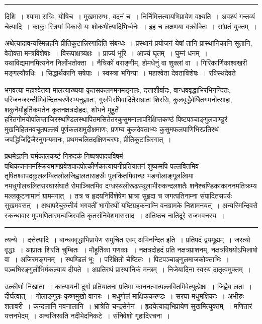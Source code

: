 \documentclass[11pt, openany]{book}
\begin{document}
\vspace{2mm}
\hrule

\noindent
{\s दिशि~। श्यामा रात्रिः, योषिच~। मुखमारम्भः, वदनं च~। निर्निमित्तत्यायभिप्रायेण वक्ष्यति~। अवश्यं गन्तव्यं चेत्यादि~। {\qt काकुः स्त्रियां विकारो यः शोकभीत्यादिभिर्ध्वनेः}~। इह च लक्षणया वक्रोक्तिः~। सांप्रतं युक्तम्~।

अथेत्यादावन्यस्मिन्नहनि प्रीतिकूटान्निरगादिति संबन्धः~। प्रस्थानं प्रयोजनं येषां तानि प्रास्थानिकानि सूतानि, वेदोक्ता मन्त्रविशेषाः~। विरूपाक्षत्र्यक्षः~। प्राज्यं भूरि~। आज्यं घृतम्~। घुम्नं धनम्~। यथाविद्यमानमित्यनेन निर्लोभतोक्ता~। नैचिकों वराङ्गीम्, होमधेनुं वा शुक्लां वा~। गिरिकार्णिकाश्वखरी मङ्गल्यौषधिः~। सिद्धार्थकानि सषेपाः~। स्वस्त्रा भगिन्या~। महाश्वेता देवताविशेषः~। रविस्थदेवते}

\newpage

\noindent
भगवत्या महाश्वेतया मालत्याख्यया कृतसकलगमनमङ्गलः, दत्ताशीर्वादः, वान्धववृद्धाभिरभिनन्दितः, परिजनजरन्तीभिर्वन्दितचरणैरभ्यनुज्ञातः, गुरुभिरभिवादितैराघ्रातः शिरसि, कुलवृद्धैर्वर्धितगमनोत्साहः, शकुनैमौहूर्तिकमतेन कृतनक्षत्रदोहदः, शोभने मुहूर्ते हरितगोमयोपलिप्ताजिरस्थण्डिलस्थापितमसितेतरकुसुममालापरिक्षिप्तकण्ठं पिष्टपञ्चाङ्गुलपाण्डुरं मुखनिहितनवचूतपल्लवं पूर्णकलशमुदीक्षमाणः, प्रणम्य कुलदेवताभ्यः कुसुमफलपाणिभिरप्रतिरथं जपद्धिजिद्विजैरनुगम्यमानः, प्रथमचलितदक्षिणचरणः, प्रीतिकूटान्निरगात्~।

प्रथमेऽहनि घर्मकालकष्टं निरुदकं निष्पत्रपादपविषमं पथिकजननमस्क्रियमाणप्रवेशपादपोत्कीर्णकात्यायनीप्रतियातनं शुष्कमपि पल्लवितमिव तृषितश्वापदकुललम्बितलोलजिह्वालतासहस्रैः पुलकितमिवाच्छ भङगोलाङ्गूललिामा नमधुगोलचलितसरघासंघातै रोमाञ्चितमिव दग्धस्थलीरूढस्थूलाभीरुकन्दलशतैः शनैश्चण्डिकाकाननमतिक्रम्य मल्लकूटनामानं ग्राममगात्~। तत्र च हृदयनिर्विशेषेण भ्रात्रा सुहृदा च जगत्पतिनाम्ना संपादितसपर्यः सुखमवसत्~। अथापरेचुरुत्तीर्य भगवतीं भागीरथीं यष्टिग्रहकनाम्नि वनग्रामके निशामनयत्~। अन्यस्मिन्दिवसे स्कन्धावार मुपमणितारमन्वजिरवति कृतसंनिवेशमाससाद~। अतिष्ठच नातिदूरे राजभवनस्य~।

\vspace{2mm}
\hrule

\noindent
{\s त्यन्ये~। {\qtt दत्तेत्यादि}~। बान्धववृद्धाभिप्रायेण समुचित एवम् {\qtt अभिनन्दित इति}~। प्रतिपदं द्वयमूह्यम्~। जरत्यो वृद्धाः~। आप्रातः शिरति चुम्बितः~। मौहूर्तिका गणकाः~। नक्षत्रदोहदं प्रति नक्षत्रप्राशनम्, नक्षत्रविषयोऽभिलाषो वा~। अजिरमङ्गनम्~। स्थण्डिलं भूः~। परिक्षितो चेष्टितः~। पिटपञ्चाङ्गुलमाजकोक्ताभिः~। पञ्चभिरङ्गुलीभिर्मकल्याय दीयते~। अप्रतिरथं प्रास्थानिकं मन्त्रम्~। निजेयादिना स्वस्य दातृत्वमुक्तम्~।

उत्कीर्णा निखाता~। कात्यायनी दुर्गा प्रतियातना प्रतिमा काननत्वात्पल्लवितमिवेत्युत्प्रेक्षा~। जिह्वैव लता~। दीर्घत्वात्~। गोलाङ्गूलः कृष्णमुखो वानरः~। मधुगोलं माक्षिककरण्डः~। सरघा मधुमक्षिकाः~। अभीरुः शतावरी~। कन्दलानि नवनालानि~। भ्रात्रेति चन्द्रसेनेन~। हृदयेत्याद्यभिप्रायेण सुखमित्युक्तम्~। मणितारं यत्तनभेदम्~। अन्वजिरवति नदीभेदनिकटे~। संनिवेशो गृहादिरचना~।}
\end{document}
